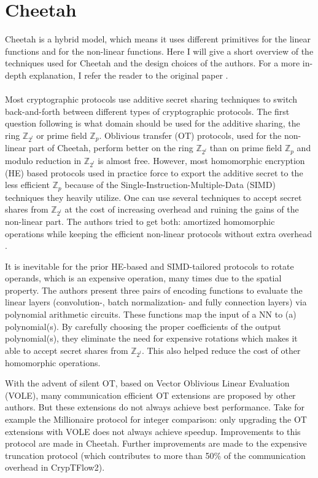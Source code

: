 \documentclass[../thesis.tex]{subfiles}
\begin{document}
\section{Cheetah}
Cheetah is a hybrid model, which means it uses different primitives for the linear functions and for the non-linear functions. Here I will give a short overview of the techniques used for Cheetah and the design choices of the authors. For a more in-depth explanation, I refer the reader to the original paper \parencite{cheetah}. \paragraph{}

Most cryptographic protocols use additive secret sharing techniques to switch back-and-forth between different types of cryptographic protocols. The first question following is what domain should be used for the additive sharing, the ring $\mathbb{Z}_{2^l}$ or prime field $\mathbb{Z}_{p}$. Oblivious transfer (OT) protocols, used for the non-linear part of Cheetah, perform better on the ring $\mathbb{Z}_{2^l}$ than on prime field $\mathbb{Z}_{p}$ and modulo reduction in $\mathbb{Z}_{2^l}$ is almost free. However, most homomorphic encryption (HE) based protocols used in practice force to export the additive secret to the less efficient $\mathbb{Z}_{p}$ because of the Single-Instruction-Multiple-Data (SIMD) techniques they heavily utilize. One can use several techniques to accept secret shares from $\mathbb{Z}_{2^l}$ at the cost of increasing overhead and ruining the gains of the non-linear part. The authors tried to get both: amortized homomorphic operations while keeping the efficient non-linear protocols without extra overhead \parencite[p 810]{cheetah}.

It is inevitable for the prior HE-based and SIMD-tailored protocols to rotate operands, which is an expensive operation, many times due to the spatial property. The authors present three pairs of encoding functions to evaluate the linear layers (convolution-, batch normalization- and fully connection layers) via polynomial arithmetic circuits. These functions map the input of a NN to (a) polynomial(s). By carefully choosing the proper coefficients of the output polynomial(s), they eliminate the need for expensive rotations which makes it able to accept secret shares from $\mathbb{Z}_{2^l}$. This also helped reduce the cost of other homomorphic operations. 

With the advent of silent OT, based on Vector Oblivious Linear Evaluation (VOLE), many communication efficient OT extensions are proposed by other authors. But these extensions do not always achieve best performance. Take for example the Millionaire protocol for integer comparison: only upgrading the OT extensions with VOLE does not always achieve speedup. Improvements to this protocol are made in Cheetah. Further improvements are made to the expensive truncation protocol (which contributes to more than 50\% of the communication overhead in CrypTFlow2).  
\end{document}
